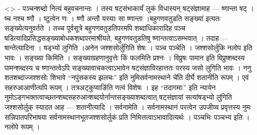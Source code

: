\textless{}\textgreater{} - पञ्चन्शब्दो नित्यं बहुवचनान्तः । तस्य
षट्संभाकार्यं लुकं विधास्यन् षट्संज्ञामाह --- ष्णान्ता षट् । ष्च नश्च
ष्णौ । ष्टुत्वेन णः । ष्णौ अन्तौ यस्याः सा ष्णान्ता ।बहुगणवतुडति
सङ्ख्या॑ इत्यतः सङ्ख्येत्यनुवर्तते । तच्च पूर्वसूत्रे बहुगणवतुडतिपरमपि
शब्दाधिकारादिह पञ्च षडित्यादिप्रसिद्धसङ्ख्याबोधकशब्दपरमाश्रीयते,
बहुगणवतुडतिषु ष्णान्तत्वाऽसम्भवात् । तदाह --- षान्तेत्यादिना । षड्भ्यो
लुगिति ।अनेन जश्शसोर्लु॑गिति शेषः । पञ्च पञ्चेति । जश्शसोर्लुकि नलोप इति
भावः । सङ्ख्या किमिति । सङ्ख्याग्रहणानुवृत्तेः किं फलमिति प्रश्नः ।
विप्रुषः पामान इति विप्रुष्शब्दस्य पामन्शब्दस्य च ष्णान्तत्वेऽपि
सङ्ख्यावाचकत्वाऽभावेन षट्संज्ञाविरहात्ततः परस्य जसो लुगिति भावः । ननु
शतशब्दाज्जश्शसोः शिभावे ``नपुंसकस्य झलचः'' इति नुमिसर्वनामस्थाने चे॑ति
दीर्घे शतानीति रूपम् । एवं सहरुआआणीत्यपि रूपम् । तत्रअट्कुप्वाङि॑ति
णत्वं विशेषः । इह ``तदागमाः'' इति न्यायेन
नुमोऽङ्गभक्तत्वाच्छतन्शब्दसहरुआन्शब्दयोर्नान्तसङ्ख्याशब्दत्वात्
षट्संज्ञायां सत्यांषड्भ्यो लु॑गिति जश्शसोर्लुक् स्यादत आह ---
शतानीत्यादि । सर्वनामेति । सर्वनामस्थानं परत्वेन उपजीव्य प्रवृत्तस्य
नुमः सन्निपातपरिभाषया सर्वनामस्थानभूतजश्शसोर्लुकं प्रति
निमित्तत्वाऽभावादित्यर्थः । पञ्चभिः पञ्चभ्य इति । नलोपे रूपम् ।
